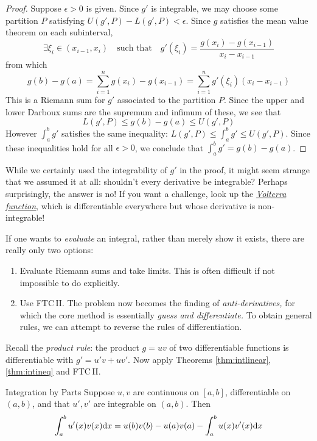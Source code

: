 \begin{proof}
	Suppose $\epsilon>0$ is given. Since $g'$ is integrable, we may choose some partition $P$ satisfying $U(g',P)-L(g',P)<\epsilon$. Since $g$ satisfies the mean value theorem on each subinterval,
	\[
		\exists \xi_i\in(x_{i-1},x_i)
		\quad\text{such that} \quad 
		g'(\xi_i)=\frac{g(x_i)-g(x_{i-1})}{x_i-x_{i-1}}
	\]
	from which
	\[
		g(b)-g(a) =\sum_{i=1}^ng(x_i)-g(x_{i-1})
		=\sum_{i=1}^ng'(\xi_i)(x_i-x_{i-1})
	\]
	This is a Riemann sum for $g'$ associated to the partition $P$. Since the upper and lower Darboux sums are the supremum and infimum of these, we see that
	\[
		L(g',P)\le g(b)-g(a)\le U(g',P)
	\]
	However $\int_a^bg'$ satisfies the same inequality: $L(g',P)\le \int_a^bg'\le U(g',P)$. Since these inequalities hold for all $\epsilon>0$, we conclude that $\int_a^bg'=g(b)-g(a)$.
\end{proof}

While we certainly used the integrability of $g'$ in the proof, it might seem strange that we assumed it at all: shouldn't every derivative be integrable? Perhaps surprisingly, the answer is no! If you want a challenge, look up the \href{https://en.wikipedia.org/wiki/Volterra's_function}{\emph{Volterra function}}, which is differentiable everywhere but whose derivative is non-integrable!



If one wants to \emph{evaluate} an integral, rather than merely show it exists, there are really only two options:
\begin{enumerate}
  \item Evaluate Riemann sums and take limits. This is often difficult if not impossible to do explicitly.
  \item Use FTC\,II. The problem now becomes the finding of \emph{anti-derivatives,} for which the core method is essentially \emph{guess and differentiate.} To obtain general rules, we can attempt to reverse the rules of differentiation.
\end{enumerate}




Recall the \emph{product rule}: the product $g=uv$ of two differentiable functions is differentiable with $g'=u' v+uv'$. Now apply Theorems \ref{thm:intlinear}, \ref{thm:intineq} and FTC\,II.

\begin{cor}{Integration by Parts}{}
	Suppose $u,v$ are continuous on $[a,b]$, differentiable on $(a,b)$, and that $u',v'$ are integrable on $(a,b)$. Then
	\[
		\int_a^bu'(x)v(x){\mathrm{d} x} =u(b)v(b)-u(a)v(a) -\int_a^bu(x)v'(x){\mathrm{d} x}
	\]
\end{cor}


